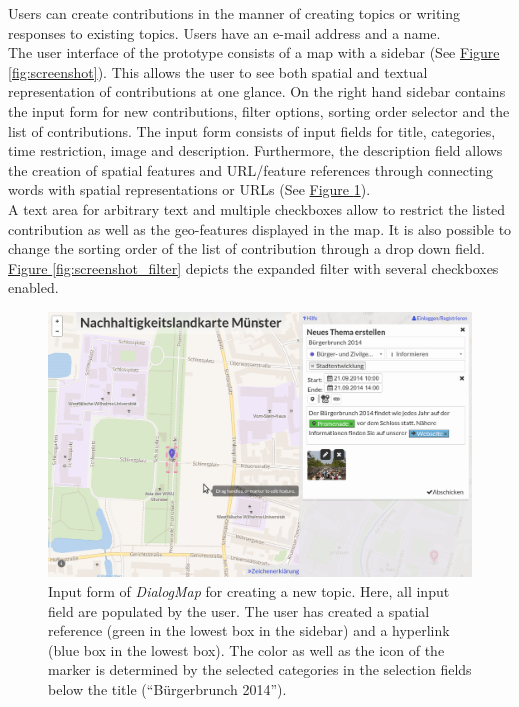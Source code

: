 Users can create contributions in the manner of creating topics or writing responses to existing topics. Users have an e-mail address and a name. \\
The user interface of the prototype consists of a map with a sidebar (See \hyperref[fig:screenshot]{Figure \ref{fig:screenshot}}). This allows the user to see both spatial and textual representation of contributions at one glance. On the right hand sidebar contains the input form for new contributions, filter options, sorting order selector and the list of contributions. The input form consists of input fields for title, categories, time restriction, image and description. Furthermore, the description field allows the creation of spatial features and URL/feature references through connecting words with spatial representations or URLs (See \hyperref[fig:screenshot_create]{Figure \ref{fig:screenshot_create}}).\\
A text area for arbitrary text and multiple checkboxes allow to restrict the listed contribution as well as the geo-features displayed in the map. It is also possible to change the sorting order of the list of contribution through a drop down field. \hyperref[fig:screenshot_filter]{Figure \ref{fig:screenshot_filter}} depicts the expanded filter with several checkboxes enabled.

\begin{figure}[!h]
    \centering
    \includegraphics[width=1\columnwidth]{images/screenshot_create}
    \caption{Input form of \textit{DialogMap} for creating a new topic. Here, all input field are populated by the user. The user has created a spatial reference (green in the lowest box in the sidebar) and a hyperlink (blue box in the lowest box). The color as well as the icon of the marker is determined by the selected categories in the selection fields below the title (``Bürgerbrunch 2014'').}
    \label{fig:screenshot_create}
\end{figure}

